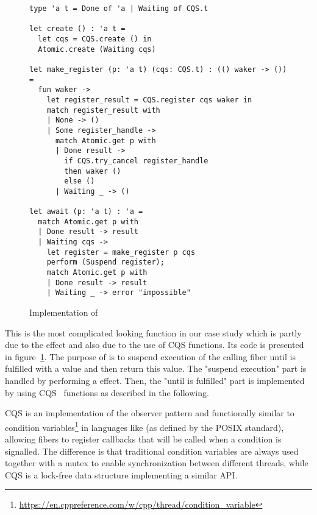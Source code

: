 \begin{figure}[ht]
  \begin{verbatim}
type 'a t = Done of 'a | Waiting of CQS.t

let create () : 'a t = 
  let cqs = CQS.create () in
  Atomic.create (Waiting cqs)

let make_register (p: 'a t) (cqs: CQS.t) : (() waker -> ()) = 
  fun waker ->
    let register_result = CQS.register cqs waker in
    match register_result with
    | None -> ()
    | Some register_handle ->
      match Atomic.get p with
      | Done result ->  
        if CQS.try_cancel register_handle
        then waker ()
        else ()
      | Waiting _ -> ()

let await (p: 'a t) : 'a = 
  match Atomic.get p with
  | Done result -> result
  | Waiting cqs ->
    let register = make_register p cqs
    perform (Suspend register);
    match Atomic.get p with
    | Done result -> result 
    | Waiting _ -> error "impossible"
  \end{verbatim}
  \caption{Implementation of }
  \label{fig:sched-impl-await}
\end{figure}

This is the most complicated looking function in our case study which is partly due to the \esuspend{} effect and also due to the use of CQS functions.
Its code is presented in figure~\ref{fig:sched-impl-await}.
The purpose of  is to suspend execution of the calling fiber until  is fulfilled with a value and then return this value.
The "suspend execution" part is handled by performing a \esuspend{} effect.
Then, the "until  is fulfilled" part is implemented by using CQS~\cite{koval2023cqs} functions as described in the following.

CQS is an implementation of the observer pattern and functionally similar to condition variables\footnote{\url{https://en.cppreference.com/w/cpp/thread/condition_variable}} in languages like \CC{} (as defined by the POSIX standard), allowing fibers to register callbacks that will be called when a condition is signalled.
The difference is that traditional condition variables are always used together with a mutex to enable synchronization between different threads, while CQS is a lock-free data structure implementing a similar API.

